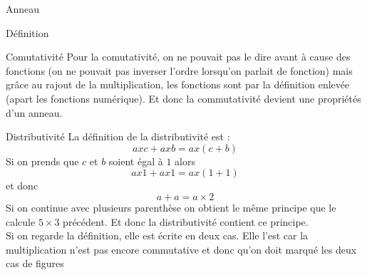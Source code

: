 \begin{parag}{Anneau}
\begin{subparag}{Définition}
    \end{subparag}
    \begin{subparag}{Comutativité}
        Pour la comutativité, on ne pouvait pas le dire avant à cause des fonctions (on ne pouvait pas inverser l'ordre lorsqu'on parlait de fonction) mais grâce au rajout de la multiplication, les fonctions sont par la définition enlevée (apart les fonctions numérique). Et donc la commutativité devient une propriétés d'un anneau.        
    \end{subparag}
    \begin{subparag}{Distributivité}
        La définition de la distributivité est :
        \[axc + axb = ax(c + b)\]
        Si on prends que $c$ et $b$ soient égal à $1$ alors
        \[ax1 + ax1 = ax(1+1)\]
        et donc
        \[a + a = a \times 2\]
        Si on continue avec plusieurs parenthèse on obtient le même principe que le calcule $5 \times 3$ précédent. Et donc la distributivité contient ce principe.
        \\
        Si on regarde la définition, elle est écrite en deux cas. Elle l'est car la multiplication n'est pas encore commutative et donc qu'on doit marqué les deux cas de figures
    \end{subparag}
\end{parag}
